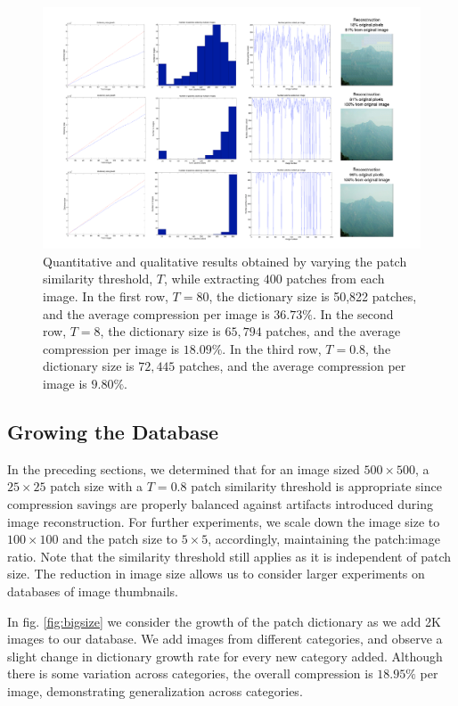  \begin{figure}
\includegraphics[width=1\linewidth]{Figures/perfGraphs_25.pdf}
\caption{Quantitative and qualitative results obtained by varying the patch similarity threshold, $T$, while extracting $400$ patches from each image. In the first row, $T=80$, the dictionary size is 50,822 patches, and the average compression per image is $36.73\%$. In the second row, $T=8$, the dictionary size is $65,794$ patches, and the average compression per image is $18.09\%$. In the third row, $T=0.8$, the dictionary size is $72,445$ patches, and the average compression per image is $9.80\%$.}
\label{fig:perfGraphs}
\end{figure}

\subsection{Growing the Database}

In the preceding sections, we determined that for an image sized $500\times 500$, a $25\times 25$ patch size with a $T=0.8$ patch similarity threshold is appropriate since compression savings are properly balanced against artifacts introduced during image reconstruction. For further experiments, we scale down the image size to $100\times 100$ and the patch size to $5\times 5$, accordingly, maintaining the patch:image ratio. Note that the similarity threshold still applies as it is independent of patch size. The reduction in image size allows us to consider larger experiments on databases of image thumbnails. 

In fig. \ref{fig:bigsize} we consider the growth of the patch dictionary as we add 2K images to our database. We add images from different categories, and observe a slight change in dictionary growth rate for every new category added. Although there is some variation across categories, the overall compression is $18.95\%$ per image, demonstrating generalization across categories.

